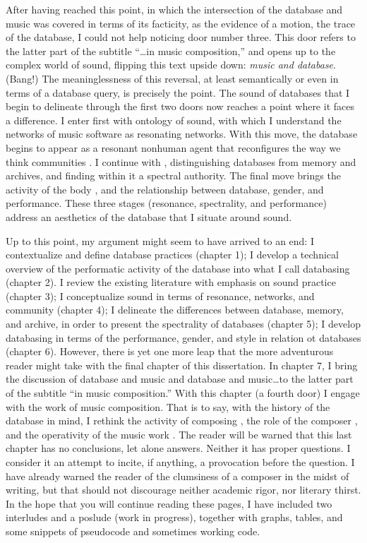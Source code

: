 After having reached this point, in which the intersection of the database and music was covered in terms of its facticity, as the evidence of a motion, the trace of the database, I could not help noticing door number three. This door refers to the latter part of the subtitle ``\dots in music composition,'' and opens up to the complex world of sound, flipping this text upside down: \textit{music and database}. (Bang!) The meaninglessness of this reversal, at least semantically or even in terms of a database query, is precisely the point. The sound of databases that I begin to delineate through the first two doors now reaches a point where it faces a difference. I enter first with  ontology of sound, with which I understand the networks of music software as resonating networks. With this move, the database begins to appear as a resonant nonhuman agent \parencite{Lat90:On} that reconfigures the way we think communities \parencite{Nan90:The}. I continue with \textcite{Der78:Wri,Der95:Arc}, distinguishing databases from memory and archives, and finding within it a spectral authority. The final move brings the activity of the body \parencite{But88:Per}, and the relationship between database, gender, and performance. These three stages (resonance, spectrality, and performance) address an aesthetics of the database that I situate around sound. 

Up to this point, my argument might seem to have arrived to an end: I contextualize and define database practices (chapter 1); I develop a technical overview of the performatic activity of the database into what I call databasing (chapter 2). I review the existing literature with emphasis on sound practice (chapter 3); I conceptualize sound in terms of resonance, networks, and community (chapter 4); I delineate the differences between database, memory, and archive, in order to present the spectrality of databases (chapter 5); I develop databasing in terms of the performance, gender, and style in relation ot databases (chapter 6). However, there is yet one more leap that the more adventurous reader might take with the final chapter of this dissertation. In chapter 7, I bring the discussion of database and music and database and music\dots to the latter part of the subtitle ``in music composition.'' With this chapter (a fourth door) I engage with the work of music composition. That is to say, with the history of the database in mind, I rethink the activity of composing \parencite{Vag01:Som}, the role of the composer \parencite{Lew99:Int}, and the operativity of the music work \parencite{Cas00:The}. The reader will be warned that this last chapter has no conclusions, let alone answers. Neither it has proper questions. I consider it an attempt to incite, if anything, a provocation before the question. I have already warned the reader of the clumsiness of a composer in the midst of writing, but that should not discourage neither academic rigor, nor literary thirst. In the hope that you will continue reading these pages, I have included two interludes and a poslude (work in progress), together with graphs, tables, and some snippets of pseudocode and sometimes working code.
